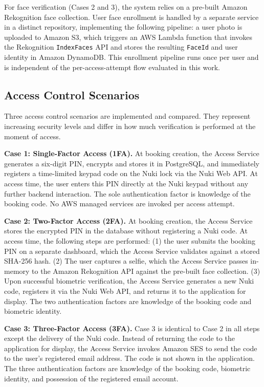 For face verification (Cases 2 and 3), the system relies on a pre-built Amazon Rekognition face collection. User face enrollment is handled by a separate service in a distinct repository, implementing the following pipeline: a user photo is uploaded to Amazon S3, which triggers an AWS Lambda function that invokes the Rekognition \texttt{IndexFaces} API and stores the resulting \texttt{FaceId} and user identity in Amazon DynamoDB. This enrollment pipeline runs once per user and is independent of the per-access-attempt flow evaluated in this work.

\subsection{Access Control Scenarios}

Three access control scenarios are implemented and compared. They represent increasing security levels and differ in how much verification is performed at the moment of access.

\textbf{Case 1: Single-Factor Access (1FA).}
At booking creation, the Access Service generates a six-digit PIN, encrypts and stores it in PostgreSQL, and immediately registers a time-limited keypad code on the Nuki lock via the Nuki Web API. At access time, the user enters this PIN directly at the Nuki keypad without any further backend interaction. The sole authentication factor is knowledge of the booking code. No AWS managed services are invoked per access attempt.

\textbf{Case 2: Two-Factor Access (2FA).}
At booking creation, the Access Service stores the encrypted PIN in the database without registering a Nuki code. At access time, the following steps are performed: (1) the user submits the booking PIN on a separate dashboard, which the Access Service validates against a stored SHA-256 hash. (2) The user captures a selfie, which the Access Service passes in-memory to the Amazon Rekognition API against the pre-built face collection. (3) Upon successful biometric verification, the Access Service generates a new Nuki code, registers it via the Nuki Web API, and returns it to the application for display. The two authentication factors are knowledge of the booking code and biometric identity.

\textbf{Case 3: Three-Factor Access (3FA).}
Case 3 is identical to Case 2 in all steps except the delivery of the Nuki code. Instead of returning the code to the application for display, the Access Service invokes Amazon SES to send the code to the user's registered email address. The code is not shown in the application. The three authentication factors are knowledge of the booking code, biometric identity, and possession of the registered email account.

